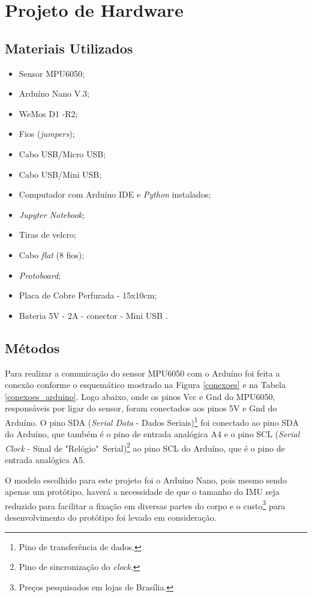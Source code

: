\section{Projeto de Hardware}

	\subsection{Materiais Utilizados}
		\begin{itemize}
			
			\item Sensor MPU6050;
			\item Arduíno Nano V.3;
			\item WeMos D1 -R2;
			\item Fios (\textit{jumpers});
			\item Cabo USB/Micro USB;
			\item Cabo USB/Mini USB;
			\item Computador com Arduíno IDE e \textit{Python} instalados;
			\item \textit{Jupyter Notebook};
			\item Tiras de velcro;
			\item Cabo \textit{flat} (8 fios);
			\item \textit{Protoboard};
			\item Placa de Cobre  Perfurada - 15x10cm;
			\item Bateria 5V - 2A -  conector - Mini USB .
		\end{itemize}	
	 
	\subsection{Métodos}
		
		Para realizar a comunicação do sensor MPU6050 com o Arduíno foi feita a conexão conforme o esquemático mostrado na Figura \ref{conexoes} e na Tabela \ref{conexoes_arduino}. Logo abaixo, onde os pinos Vcc e Gnd do MPU6050, responsáveis por ligar do sensor, foram conectados aos pinos 5V e Gnd do Arduíno. O pino SDA (\textit{Serial Data} - Dados Seriais)\footnote{Pino de transferência de dados.} foi conectado ao pino SDA do Arduíno, que também é o pino de entrada analógica A4 e o pino SCL (\textit{Serial Clock} - Sinal de "Relógio"\ Serial)\footnote{Pino de sincronização do \textit{clock}.} ao pino SCL do Arduíno, que é o pino de entrada analógica A5.  
		
		O  modelo escolhido para este projeto foi o Arduíno Nano, pois mesmo sendo apenas um protótipo, haverá a necessidade de que o tamanho do IMU seja reduzido para facilitar a fixação em diversas partes do corpo e o custo\footnote{Preços pesquisados em lojas de Brasília.} para desenvolvimento do protótipo foi levado em consideração.
		
